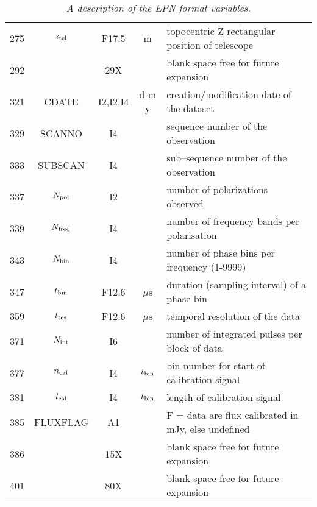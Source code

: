 \documentclass[11pt]{article}
\begin{document}
\begin{table}
\begin{center}
\begin{tabular}{|rcccp{8cm}|}
275  & $z_{\rm tel}$& F17.5& m & topocentric Z rectangular position of telescope \\
292 &         & 29X   &  &  blank space free for future expansion \\
\hline
321  & CDATE & I2,I2,I4 & d m y & creation/modification date of the dataset \\
329  & SCANNO & I4 &  & sequence number of the observation \\
333  & SUBSCAN & I4 &  &sub--sequence number of the observation \\
337  & $N_{\rm pol}$ & I2 &  & number of polarizations observed \\ 
339  & $N_{\rm freq}$ & I4 & & number of frequency bands per polarisation \\
343  & $N_{\rm bin}$ & I4  & & number of phase bins per frequency (1-9999) \\
347  & $t_{\rm bin}$ & F12.6 & $\mu$s & duration (sampling interval) of a phase bin \\
359  & $t_{\rm res}$ & F12.6 & $\mu$s & temporal resolution of the data \\
371  & $N_{\rm int}$ & I6  & & number of integrated pulses per block of data \\
377  & $n_{\rm cal}$ & I4 & $t_{\rm bin}$ & bin number for start of calibration signal\\
381  & $l_{\rm cal}$ & I4 & $t_{\rm bin}$ & length of calibration signal \\
385  & FLUXFLAG      & A1 &    & F = data are flux calibrated in mJy, else undefined \\
386  & & 15X  & & blank space free for future expansion \\
\hline
401 &         & 80X   &  &  blank space free for future expansion \\
\hline
\end{tabular}
\normalsize
\caption{\sl A description of the EPN format variables.}
\label{epnheader}
\end{center}
\end{table}
\end{document}
